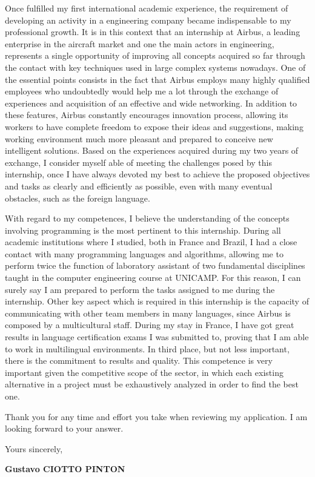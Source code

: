 \documentclass[12pt, a4paper]{article}
\begin{document}
\vspace{12pt}

Once fulfilled my first international academic experience, the requirement of
developing an activity in a engineering company became indispensable to my
professional growth. It is in this context that an internship at Airbus, a
leading enterprise in the aircraft market and one the main actors in
engineering, represents a single opportunity of improving all concepts acquired
so far through the contact with key techniques used in large complex systems
nowadays.  One of the essential points consists in the fact that Airbus employs
many highly qualified employees who undoubtedly would help me a lot through
the exchange of experiences and acquisition of an effective and wide
networking. In addition  to these features, Airbus constantly encourages
innovation process, allowing its workers to have complete freedom to expose their ideas and
suggestions, making working environment much more pleasant and prepared to
conceive new intelligent solutions. Based on the experiences acquired during my
two years of exchange, I consider myself able of meeting the challenges posed by
this internship, once I have always devoted my best to achieve the proposed
objectives and tasks as clearly and efficiently as possible, even with many
eventual obstacles, such as the foreign language.


\vspace{12pt}

With regard to my competences,  I believe the understanding of the concepts
involving programming is the most pertinent to this internship. During all
academic institutions where I studied, both in France and Brazil, I had a close
contact with many programming languages and algorithms, allowing me to perform
twice the function of laboratory assistant of two fundamental disciplines taught
in the computer engineering course at UNICAMP. For this reason, I can surely say
I am prepared to perform the tasks assigned to me during the internship. Other
key aspect which is required in this internship is the capacity of communicating
with other team members in many languages, since Airbus is composed by a
multicultural staff. During my stay in France, I have got great results in
language certification exams I was submitted to, proving that I am able to work
in multilingual environments. In third place, but not less important, there is
the commitment to results and quality. This competence is very important given
the competitive scope of the sector,  in which each existing alternative  in a
project must be exhaustively analyzed in order to find the best one.


	
\vspace{12pt}

Thank you for any time and effort you take when reviewing my application. I am
looking forward to your answer.

\vspace{12pt}

Yours sincerely,

\vspace{12pt}

\textbf{Gustavo CIOTTO PINTON}
\end{document}
